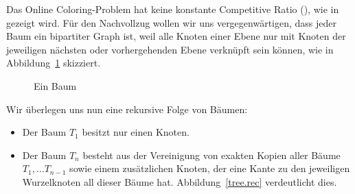 \documentclass[11pt,abstracton]{scrreprt} %
\theoremstyle{definition}
\begin{document}
\bigskip

Das Online Coloring-Problem hat keine konstante Competitive Ratio (\cite{bipartite}), wie in \cite{gyarfas} gezeigt wird. Für den Nachvollzug wollen wir uns vergegenwärtigen, dass jeder Baum ein bipartiter Graph ist, weil alle Knoten einer Ebene nur mit Knoten der jeweiligen nächsten oder vorhergehenden Ebene verknüpft sein können, wie in Abbildung~\ref{tree} skizziert.

\begin{figure}
\caption{Ein Baum}
\label{tree}
\begin{center}
\end{center}
\end{figure}

Wir überlegen uns nun eine rekursive Folge von Bäumen:
\begin{itemize}
\item Der Baum $T_1$ besitzt nur einen Knoten.
\item Der Baum $T_n$ besteht aus der Vereinigung von exakten Kopien aller Bäume $T_1, \dots T_{n-1}$ sowie einem zusätzlichen Knoten, der eine Kante zu den jeweiligen Wurzelknoten all dieser Bäume hat. Abbildung~\ref{tree.rec} verdeutlicht dies.
\end{itemize}
\end{document}
